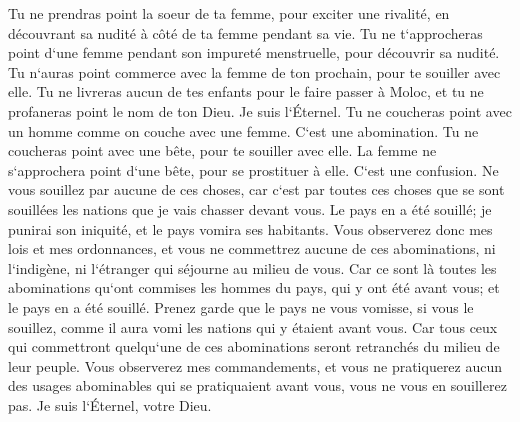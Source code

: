 \verse Tu ne prendras point la soeur de ta femme, pour exciter une rivalité, en découvrant sa nudité à côté de ta femme pendant sa vie. 
\verse Tu ne t`approcheras point d`une femme pendant son impureté menstruelle, pour découvrir sa nudité. 
\verse Tu n`auras point commerce avec la femme de ton prochain, pour te souiller avec elle. 
\verse Tu ne livreras aucun de tes enfants pour le faire passer à Moloc, et tu ne profaneras point le nom de ton Dieu. Je suis l`Éternel. 
\verse Tu ne coucheras point avec un homme comme on couche avec une femme. C`est une abomination. 
\verse Tu ne coucheras point avec une bête, pour te souiller avec elle. La femme ne s`approchera point d`une bête, pour se prostituer à elle. C`est une confusion. 
\verse Ne vous souillez par aucune de ces choses, car c`est par toutes ces choses que se sont souillées les nations que je vais chasser devant vous. 
\verse Le pays en a été souillé; je punirai son iniquité, et le pays vomira ses habitants. 
\verse Vous observerez donc mes lois et mes ordonnances, et vous ne commettrez aucune de ces abominations, ni l`indigène, ni l`étranger qui séjourne au milieu de vous. 
\verse Car ce sont là toutes les abominations qu`ont commises les hommes du pays, qui y ont été avant vous; et le pays en a été souillé. 
\verse Prenez garde que le pays ne vous vomisse, si vous le souillez, comme il aura vomi les nations qui y étaient avant vous. 
\verse Car tous ceux qui commettront quelqu`une de ces abominations seront retranchés du milieu de leur peuple. 
\verse Vous observerez mes commandements, et vous ne pratiquerez aucun des usages abominables qui se pratiquaient avant vous, vous ne vous en souillerez pas. Je suis l`Éternel, votre Dieu. 

